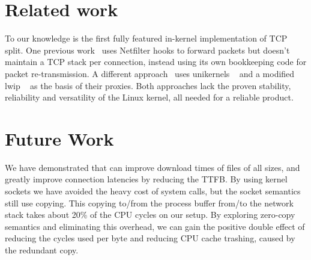 \section{Related work}
To our knowledge \oursys is the first fully featured in-kernel implementation of TCP split.
One previous work~\cite{kernelsplit} uses Netfilter hooks to forward packets but doesn't maintain a TCP stack per connection, instead using its own bookkeeping code for packet re-transmission.
A different approach~\cite{siracusano2016miniproxy} uses unikernels ~\cite{kivity2014v} and a modified lwip ~\cite{dunkels2001design} as the basis of their proxies. Both approaches lack the proven stability, reliability and versatility of the Linux kernel, all needed for a reliable product.

\section{Future Work}
We have demonstrated that \oursys can improve download times of files of all sizes, and greatly improve connection latencies by reducing the TTFB. 
By using kernel sockets we have avoided the heavy cost of system calls, but the socket semantics still use copying. This copying to/from the process buffer from/to the network stack takes about 20\% of the CPU cycles on our setup. By exploring zero-copy semantics and eliminating this overhead, we can gain the positive double effect of reducing the cycles used per byte and reducing CPU cache trashing, caused by the redundant copy.